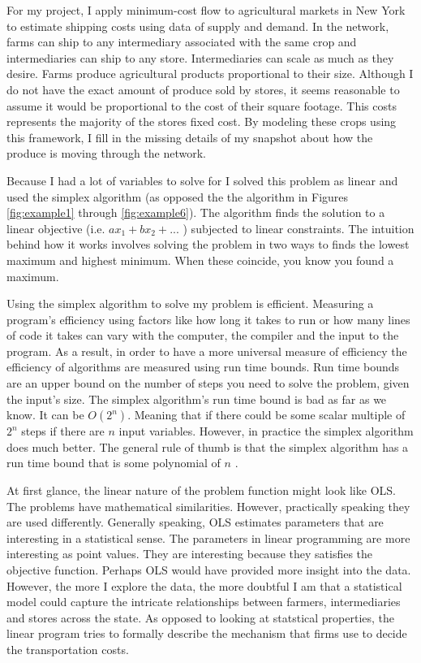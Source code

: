 \documentclass{report}
\begin{document}
For my project, I apply minimum-cost flow to agricultural markets in New York to estimate shipping costs using data of supply and demand. In the network, farms can ship to any intermediary associated with the same crop and intermediaries can ship to any store. Intermediaries can scale as much as they desire. Farms produce agricultural products proportional to their size. Although I do not have the exact amount of produce sold by stores, it seems reasonable to assume it would be proportional to the cost of their square footage. This costs represents the majority of the stores fixed cost. By modeling these crops using this framework, I fill in the missing details of my snapshot about how the produce is moving through the network.

Because I had a lot of variables to solve for I solved this problem as linear and used the simplex algorithm (as opposed the the algorithm in Figures \ref{fig:example1} through \ref{fig:example6}). The algorithm finds the solution to a linear objective (i.e. $a x_1 +b x_2 + ...$ ) subjected to linear constraints. The intuition behind how it works involves solving the problem in two ways to finds the lowest maximum and highest minimum. When these coincide,  you know you found a maximum.

Using the simplex algorithm to solve my problem is efficient. Measuring a program's efficiency using factors like how long it takes to run or how many lines of code it takes can vary with the computer, the compiler and the input to the program. As a result, in order to have a more universal measure of efficiency the efficiency of algorithms are measured using run time bounds. Run time bounds are an upper bound on the number of steps you need to solve the problem, given the input's size.  The simplex algorithm's run time bound is bad as far as we know. It can be $O(2^n)$. Meaning that if there could be some scalar multiple of $2^n$ steps if there are $n$ input variables. However, in practice the simplex algorithm does much better. The general rule of thumb is that the simplex algorithm has a run time bound that is some polynomial of $n$ \cite{Cook}.

At first glance, the  linear nature of the problem function might look like OLS. The problems have mathematical similarities. However, practically speaking they are used differently. Generally speaking, OLS estimates parameters that are interesting in a statistical sense.  The parameters in linear programming are more interesting as point values. They are interesting because they satisfies the objective function. Perhaps OLS would have provided more insight into the data. However, the more I explore the data, the more doubtful I am that a statistical model could capture the intricate relationships between farmers, intermediaries and stores across the state. As opposed to looking at statstical properties, the linear program tries to formally describe the mechanism that firms use to decide the transportation costs.
\end{document}
